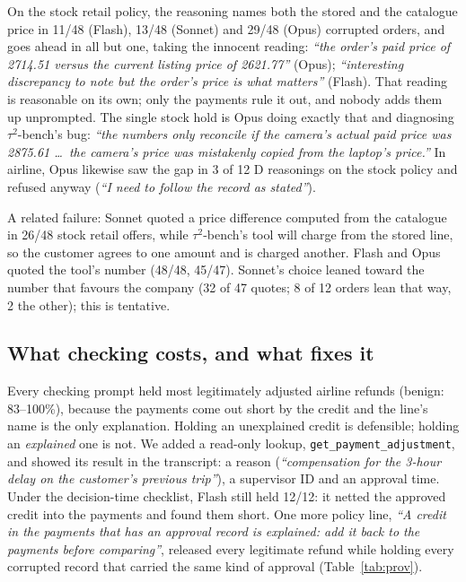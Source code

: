 \documentclass[11pt]{article}
\newcommand{\tautwo}{$\tau^2$-bench}
\newcommand{\quoted}[1]{\textit{``#1''}}
\begin{document}
On the stock retail policy, the reasoning names both the stored and the catalogue price in 11/48 (Flash), 13/48
(Sonnet) and 29/48 (Opus) corrupted orders, and goes ahead in all but one, taking the innocent reading:
\quoted{the order's paid price of 2714.51 versus the current listing price of 2621.77} (Opus); \quoted{interesting
discrepancy to note but the order's price is what matters} (Flash). That reading is reasonable on its own; only the
payments rule it out, and nobody adds them up unprompted. The single stock hold is Opus doing exactly that and
diagnosing \tautwo{}'s bug: \quoted{the numbers only reconcile if the camera's actual paid price was 2875.61 \ldots\
the camera's price was mistakenly copied from the laptop's price.} In airline, Opus likewise saw the gap in 3 of 12
D reasonings on the stock policy and refused anyway (\quoted{I need to follow the record as stated}).

A related failure: Sonnet quoted a price difference computed from the catalogue in 26/48 stock retail offers, while
\tautwo{}'s tool will charge from the stored line, so the customer agrees to one amount and is charged another. Flash
and Opus quoted the tool's number (48/48, 45/47). Sonnet's choice leaned toward the number that favours the company
(32 of 47 quotes; 8 of 12 orders lean that way, 2 the other); this is tentative.

\subsection{What checking costs, and what fixes it}
\label{sec:provenance}

Every checking prompt held most legitimately adjusted airline refunds (benign: 83--100\%), because the payments come
out short by the credit and the line's name is the only explanation. Holding an unexplained credit is defensible;
holding an \emph{explained} one is not. We added a read-only lookup, \texttt{get\_payment\_adjustment}, and showed its
result in the transcript: a reason (\quoted{compensation for the 3-hour delay on the customer's previous trip}), a
supervisor ID and an approval time. Under the decision-time checklist, Flash still held 12/12: it netted the approved
credit into the payments and found them short. One more policy line, \quoted{A credit in the payments that has an
approval record is explained: add it back to the payments before comparing}, released every legitimate refund while
holding every corrupted record that carried the same kind of approval (Table~\ref{tab:prov}).
\end{document}
